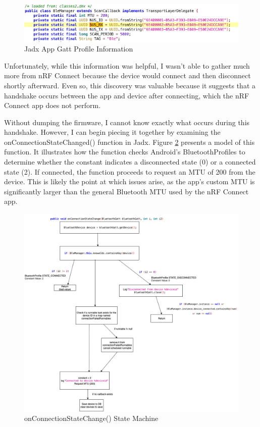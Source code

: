\begin{figure}[H]
	\centering
	\includegraphics[scale=.8]{bleuuidjadx}
	\caption{Jadx App Gatt Profile Information}
	\label{fig:bleuuidjadx}
\end{figure}
Unfortunately, while this information was helpful, I wasn’t able to gather much more from nRF Connect because the device would connect and then disconnect shortly afterward. Even so, this discovery was valuable because it suggests that a handshake occurs between the app and device after connecting, which the nRF Connect app does not perform.

Without dumping the firmware, I cannot know exactly what occurs during this handshake. However, I can begin piecing it together by examining the onConnectionStateChanged() function in Jadx. Figure \ref*{fig:statemachineonconnection} presents a model of this function. It illustrates how the function checks Android’s BluetoothProfiles to determine whether the constant indicates a disconnected state (0) or a connected state (2). If connected, the function proceeds to request an MTU of 200 from the device. This is likely the point at which issues arise, as the app’s custom MTU is significantly larger than the general Bluetooth MTU used by the nRF Connect app.

\begin{figure}[H]
	\centering
	\includegraphics[scale=.5]{statemachineonconnection}
	\caption{onConnectionStateChange() State Machine}
	\label{fig:statemachineonconnection}
\end{figure}

